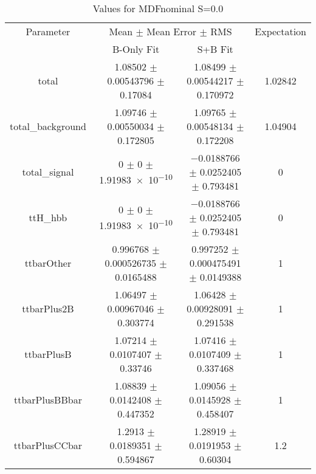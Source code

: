 \begin{table}
\centering
\caption{Values for MDFnominal S=0.0}
\begin{tabular}{cccc}
\toprule
Parameter & \multicolumn{2}{c}{Mean $\pm$ Mean Error $\pm$ RMS} & Expectation\\
 & B-Only Fit & S+B Fit & \\
\midrule
total & \num{1.08502} $\pm$ \num{0.00543796} $\pm$ \num{0.17084} & \num{1.08499} $\pm$ \num{0.00544217} $\pm$ \num{0.170972} & \num{1.02842}\\
total\_background & \num{1.09746} $\pm$ \num{0.00550034} $\pm$ \num{0.172805} & \num{1.09765} $\pm$ \num{0.00548134} $\pm$ \num{0.172208} & \num{1.04904}\\
total\_signal & \num{0} $\pm$ \num{0} $\pm$ \num{1.91983e-10} & \num{-0.0188766} $\pm$ \num{0.0252405} $\pm$ \num{0.793481} & \num{0}\\
ttH\_hbb & \num{0} $\pm$ \num{0} $\pm$ \num{1.91983e-10} & \num{-0.0188766} $\pm$ \num{0.0252405} $\pm$ \num{0.793481} & \num{0}\\
ttbarOther & \num{0.996768} $\pm$ \num{0.000526735} $\pm$ \num{0.0165488} & \num{0.997252} $\pm$ \num{0.000475491} $\pm$ \num{0.0149388} & \num{1}\\
ttbarPlus2B & \num{1.06497} $\pm$ \num{0.00967046} $\pm$ \num{0.303774} & \num{1.06428} $\pm$ \num{0.00928091} $\pm$ \num{0.291538} & \num{1}\\
ttbarPlusB & \num{1.07214} $\pm$ \num{0.0107407} $\pm$ \num{0.33746} & \num{1.07416} $\pm$ \num{0.0107409} $\pm$ \num{0.337468} & \num{1}\\
ttbarPlusBBbar & \num{1.08839} $\pm$ \num{0.0142408} $\pm$ \num{0.447352} & \num{1.09056} $\pm$ \num{0.0145928} $\pm$ \num{0.458407} & \num{1}\\
ttbarPlusCCbar & \num{1.2913} $\pm$ \num{0.0189351} $\pm$ \num{0.594867} & \num{1.28919} $\pm$ \num{0.0191953} $\pm$ \num{0.60304} & \num{1.2}\\
\bottomrule
\end{tabular}
\end{table}